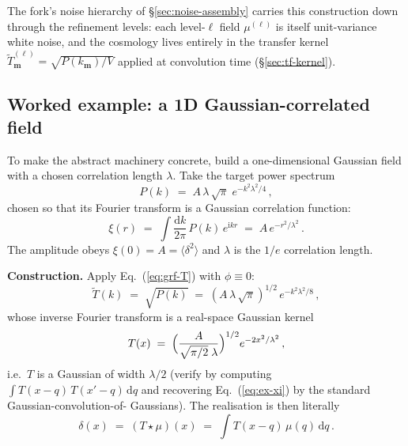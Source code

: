 \documentclass[12pt]{article}
\newcommand{\bm}{\mathbf{m}}
\begin{document}
The fork's noise hierarchy of \S\ref{sec:noise-assembly} carries
this construction down through the refinement levels: each
level-$\ell$ field $\mu^{(\ell)}$ is itself unit-variance white
noise, and the cosmology lives entirely in the transfer kernel
$\tilde T^{(\ell)}_\bm = \sqrt{P(k_\bm)/V}$ applied at convolution
time (\S\ref{sec:tf-kernel}).

\subsection{Worked example: a 1D Gaussian-correlated field}
\label{sec:grf-example}

To make the abstract machinery concrete, build a one-dimensional
Gaussian field with a chosen correlation length $\lambda$.  Take
the target power spectrum
\begin{equation}
  P(k) \;=\; A\,\lambda\,\sqrt{\pi}\;e^{-k^2 \lambda^2 / 4}\,,
  \label{eq:ex-Pk}
\end{equation}
chosen so that its Fourier transform is a Gaussian correlation
function:
\begin{equation}
  \xi(r) \;=\; \int\!\frac{\mathrm d k}{2\pi}\,P(k)\,e^{\mathrm i k r}
        \;=\; A\,e^{-r^2/\lambda^2}\,.
  \label{eq:ex-xi}
\end{equation}
The amplitude obeys $\xi(0) = A = \langle\delta^2\rangle$ and
$\lambda$ is the $1/e$ correlation length.

\textbf{Construction.}  Apply Eq.~(\ref{eq:grf-T}) with
$\phi \equiv 0$:
\begin{equation}
  \tilde T(k) \;=\; \sqrt{P(k)} \;=\; (A\,\lambda\,\sqrt\pi)^{1/2}\,
                                       e^{-k^2 \lambda^2 / 8}\,,
  \label{eq:ex-T-k}
\end{equation}
whose inverse Fourier transform is a real-space Gaussian kernel
\begin{equation}
  T(x) \;=\; \Bigl(\frac{A}{\sqrt{\pi/2}\;\lambda}\Bigr)^{1/2}
              e^{-2 x^2 / \lambda^2}\,,
  \label{eq:ex-T-x}
\end{equation}
i.e.\ $T$ is a Gaussian of width $\lambda/2$ (verify by computing
$\int T(x-q)\,T(x'-q)\,\mathrm d q$ and recovering
Eq.~(\ref{eq:ex-xi}) by the standard Gaussian-convolution-of-
Gaussians).  The realisation is then literally
\begin{equation}
  \delta(x) \;=\; (T \star \mu)(x)
              \;=\; \int T(x - q)\,\mu(q)\,\mathrm d q\,.
  \label{eq:ex-realise}
\end{equation}
\end{document}
